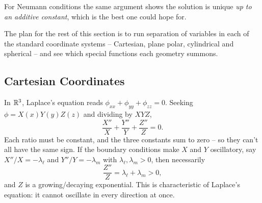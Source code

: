\documentclass[a4paper]{scrartcl}
\begin{document}
For Neumann conditions the same argument shows the solution is unique \emph{up to an additive constant}, which is the best one could hope for.

The plan for the rest of this section is to run separation of variables in each of the standard coordinate systems -- Cartesian, plane polar, cylindrical and spherical -- and see which special functions each geometry summons.

\subsection{Cartesian Coordinates}

In $\mathbb{R}^3$, Laplace's equation reads $\phi_{xx} + \phi_{yy} + \phi_{zz} = 0$. Seeking $\phi = X(x) Y(y) Z(z)$ and dividing by $XYZ$,
$$
\frac{X''}{X} + \frac{Y''}{Y} + \frac{Z''}{Z} = 0.
$$
Each ratio must be constant, and the three constants sum to zero -- so they can't all have the same sign. If the boundary conditions make $X$ and $Y$ oscillatory, say $X''/X = -\lambda_\ell$ and $Y''/Y = -\lambda_m$ with $\lambda_\ell, \lambda_m > 0$, then necessarily
$$
\frac{Z''}{Z} = \lambda_\ell + \lambda_m > 0,
$$
and $Z$ is a growing/decaying exponential. This is characteristic of Laplace's equation: it cannot oscillate in every direction at once.
\end{document}
